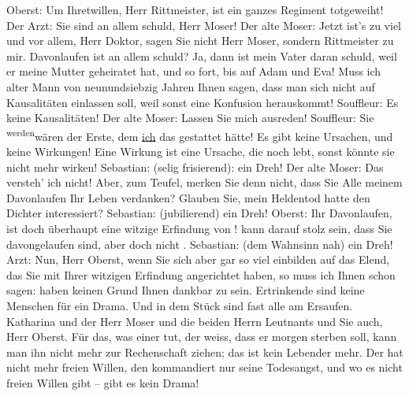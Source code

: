            \pstart
           Oberst: Um Ihretwillen, Herr Rittmeister, ist ein ganzes Regiment totgeweiht!\pend
           \pstart
           Der Arzt: Sie sind an allem schuld, Herr Moser!\pend
           \pstart
           Der alte Moser: Jetzt ist’s zu viel und vor allem, Herr Doktor, sagen Sie nicht
					Herr Moser, sondern Rittmeister zu mir. 
					Davonlaufen ist an allem schuld? Ja, {\pb}dann ist mein Vater daran
					schuld, weil er meine Mutter geheiratet hat, und so fort, bis auf Adam und Eva!
					Muss ich alter Mann von neunundsiebzig Jahren Ihnen sagen, dass man sich nicht
					auf Kausalitäten einlassen soll, weil sonst eine Konfusion herauskommt!\pend
           \pstart
           Souffleur: Es  keine Kausalitäten!\pend
           \pstart
           Der alte Moser: Lassen Sie mich ausreden!\pend
           \pstart
           Souffleur: Sie \substVorne{}\textsuperscript{werden}{\allowbreak}\substDazwischen{}wären\substHinten{} der Erste, dem \uline{ich} das gestattet hätte!
					Es gibt keine Ursachen, und keine Wirkungen! Eine Wirkung ist eine Ursache, die
					noch lebt, sonst könnte sie nicht mehr wirken!\pend
           \pstart
           Sebastian: (selig frisierend):  ein Dreh!\pend
           \pstart
           Der alte Moser: Das versteh’ ich nicht! Aber, zum Teufel, merken Sie denn nicht,
					dass Sie Alle meinem Davonlaufen Ihr Leben verdanken? Glauben Sie, mein
					Heldentod hatte den Dichter interessiert?\pend
           \pstart
           Sebastian: (jubilierend)  ein Dreh!\pend
           \pstart
           Oberst: Ihr Davonlaufen, ist doch überhaupt eine witzige Erfindung von !  kann darauf stolz
					sein, dass Sie davongelaufen sind, aber doch nicht .\pend
           \pstart
           Sebastian: (dem Wahnsinn nah)  ein Dreh!\pend
           \pstart
           Arzt: Nun, Herr Oberst, wenn Sie sich aber gar so viel einbilden auf das Elend,
					das Sie mit Ihrer witzigen Erfindung angerichtet haben, so muss ich Ihnen schon
					sagen:  haben keinen Grund Ihnen dankbar zu sein.
					Ertrinkende sind keine Menschen für ein Drama. Und in dem Stück sind fast alle
					am Ersaufen. Katharina und der Herr Moser und die beiden Herrn Leutnants und Sie
					auch, Herr Oberst. Für das, was einer tut, der weiss, dass er morgen {\pb}sterben soll, kann man ihn
					nicht mehr zur Rechenschaft ziehen; das ist kein Lebender mehr. Der hat nicht
					mehr freien Willen, den kommandiert nur seine Todesangst, und wo es nicht freien
					Willen gibt – gibt es kein Drama!\pend
